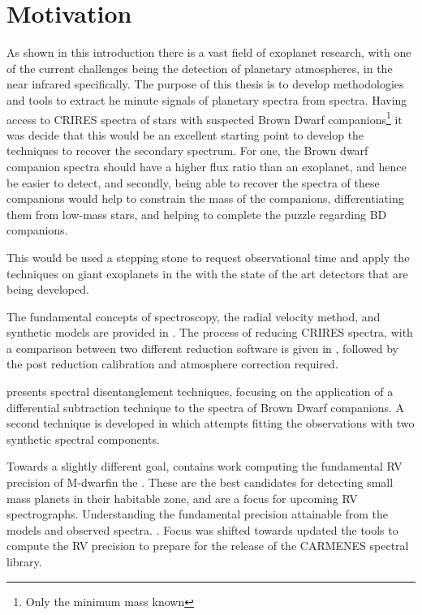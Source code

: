 \clearpage
\section{Motivation}
\label{sec:thesis_motivation}

As shown in this introduction there is a vast field of exoplanet research, with one of the current challenges being the detection of planetary atmospheres, in the near infrared specifically.
The purpose of this thesis is to develop methodologies and tools to extract he minute signals of planetary spectra from \nir{} spectra.
Having access to \nir{} CRIRES spectra of stars with suspected Brown Dwarf companions\footnote{Only the minimum mass \mtwosini known} it was decide that this would be an excellent starting point to develop the techniques to recover the secondary spectrum.
For one, the Brown dwarf companion spectra should have a higher flux ratio than an exoplanet, and hence be easier to detect, and secondly, being able to recover the spectra of these companions would help to constrain the mass of the companions, differentiating them from low-mass stars, and helping to complete the puzzle regarding BD companions.

This would be used a stepping stone to request observational time and apply the techniques on giant exoplanets in the \nir{} with the state of the art detectors that are being developed.

The fundamental concepts of \nir{} spectroscopy, the radial velocity method, and synthetic models are provided in .
The process of reducing \nir{} CRIRES spectra, with a comparison between two different reduction software is given in , followed by the post reduction calibration and atmosphere correction required.

 presents spectral disentanglement techniques, focusing on the application of a differential subtraction technique to the \nir{} spectra of Brown Dwarf companions.
A second technique is developed in  which attempts fitting the observations with two synthetic spectral components.

Towards a slightly different goal,  contains work computing the fundamental RV precision of {M-dwarf}in the \nir{}.
These are the best candidates for detecting small mass planets in their habitable zone, and are a focus for upcoming \nir{} RV spectrographs.
Understanding the fundamental precision attainable from the models and observed spectra. 
.
Focus was shifted towards updated the tools to compute the RV precision to prepare for the release of the CARMENES \nir{} spectral library.




